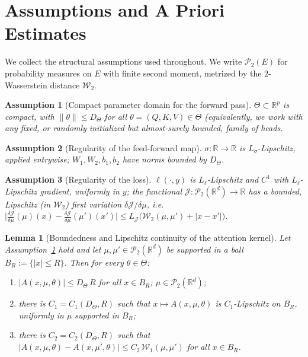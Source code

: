 \documentclass[11pt,a4wide]{article}
\newtheorem{lemma}[theorem]{Lemma}
\newtheorem{assumption}{Assumption}
\theoremstyle{definition}
\newcommand{\R}{\mathbb{R}}
\newcommand{\Prob}{\mathcal{P}}
\newcommand{\Wass}{\mathcal{W}}
\begin{document}
\section{Assumptions and A Priori Estimates}
\label{sec:assumptions}

We collect the structural assumptions used throughout. We write $\Prob_2(E)$ for probability measures on $E$ with finite second moment, metrized by the $2$-Wasserstein distance $\Wass_2$.

\begin{assumption}[Compact parameter domain for the forward pass]
\label{ass:compact-theta}
$\Theta\subset\R^p$ is compact, with $\|\theta\|\le D_\Theta$ for all $\theta=(Q,K,V)\in\Theta$ (equivalently, we work with any fixed, or randomly initialized but almost-surely bounded, family of heads. 
\end{assumption}

\begin{assumption}[Regularity of the feed-forward map]
\label{ass:ffn}
$\sigma:\R\to\R$ is $L_\sigma$-Lipschitz, applied entrywise; $W_1,W_2,b_1,b_2$ have norms bounded by $D_\Theta$.
\end{assumption}

\begin{assumption}[Regularity of the loss]
\label{ass:loss}
$\ell(\cdot,y)$ is $L_\ell$-Lipschitz and $C^1$ with $L_\ell$-Lipschitz gradient, uniformly in $y$; the functional $\mathcal J:\Prob_2(\R^d)\to\R$ has a bounded, Lipschitz (in $\Wass_2$) first variation $\delta\mathcal J/\delta\mu$, i.e.\ $\big|\tfrac{\delta\mathcal J}{\delta\mu}(\mu)(x)-\tfrac{\delta\mathcal J}{\delta\mu}(\mu')(x')\big|\le L_{\mathcal J}\big(\Wass_2(\mu,\mu')+|x-x'|\big)$.
\end{assumption}

\begin{lemma}[Boundedness and Lipschitz continuity of the attention kernel]
\label{lem:kernel-lip}
Let Assumption~\ref{ass:compact-theta} hold and let $\mu,\mu'\in\Prob_2(\R^d)$ be supported in a ball $B_R:=\{|x|\le R\}$. Then for every $\theta\in\Theta$:
\begin{enumerate}[label=(\roman*)]
\item $|A(x,\mu,\theta)| \le D_\Theta\, R$ for all $x\in B_R$; $\mu \in \Prob_2(\R^d)$;
\item there is $C_1=C_1(D_\Theta,R)$ such that $x\mapsto A(x,\mu,\theta)$ is $C_1$-Lipschitz on $B_R$, uniformly in $\mu$ supported in $B_R$;
\item there is $C_2=C_2(D_\Theta,R)$ such that $\big|A(x,\mu,\theta)-A(x,\mu',\theta)\big|\le C_2\,\Wass_1(\mu,\mu')$ for all $x\in B_R$.
\end{enumerate}
\end{lemma}
\end{document}
